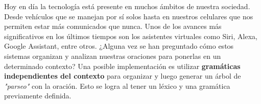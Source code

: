 Hoy en día la tecnología está presente en muchos ámbitos de nuestra sociedad. Desde vehículos que se manejan por sí solos hasta en nuestros celulares que nos permiten estar más comunicados que nunca. Unos de los avances más significativos en los últimos tiempos son los asistentes virtuales como Siri, Alexa, Google Assistant, entre otros. ¿Alguna vez se han preguntado cómo estos sistemas organizan y analizan nuestras oraciones para ponerlas en un determinado contexto? Una posible implementación es utilizar \textbf{gramáticas independientes del contexto} para organizar y luego generar un árbol de \textit{"parseo"} con la oración. Esto se logra al tener un léxico y una gramática previamente definida.